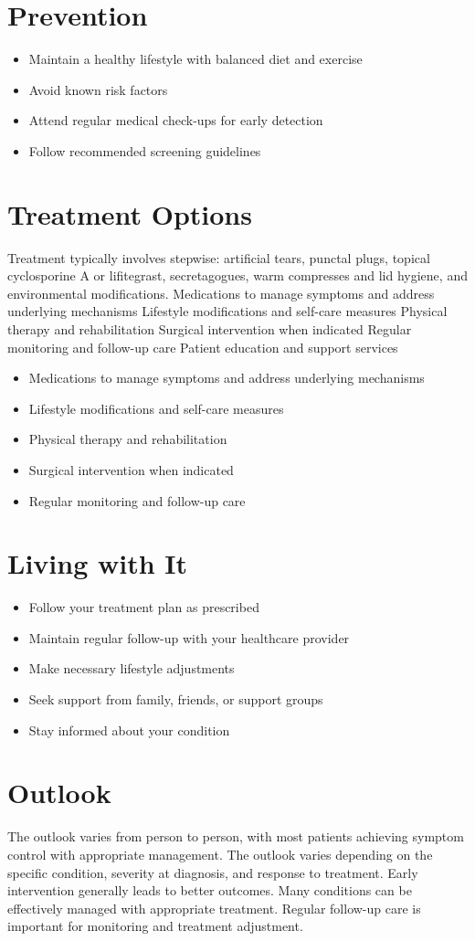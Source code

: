 \section{Prevention}
\begin{itemize}[noitemsep]
  \item Maintain a healthy lifestyle with balanced diet and exercise
  \item Avoid known risk factors
  \item Attend regular medical check-ups for early detection
  \item Follow recommended screening guidelines
\end{itemize}
\section{Treatment Options}
Treatment typically involves stepwise: artificial tears, punctal plugs, topical cyclosporine A or lifitegrast, secretagogues, warm compresses and lid hygiene, and environmental modifications. Medications to manage symptoms and address underlying mechanisms Lifestyle modifications and self-care measures Physical therapy and rehabilitation Surgical intervention when indicated Regular monitoring and follow-up care Patient education and support services

\begin{itemize}[noitemsep]
  \item Medications to manage symptoms and address underlying mechanisms
  \item Lifestyle modifications and self-care measures
  \item Physical therapy and rehabilitation
  \item Surgical intervention when indicated
  \item Regular monitoring and follow-up care
\end{itemize}
\section{Living with It}
\begin{itemize}[noitemsep]
  \item Follow your treatment plan as prescribed
  \item Maintain regular follow-up with your healthcare provider
  \item Make necessary lifestyle adjustments
  \item Seek support from family, friends, or support groups
  \item Stay informed about your condition
\end{itemize}
\section{Outlook}
The outlook varies from person to person, with most patients achieving symptom control with appropriate management. The outlook varies depending on the specific condition, severity at diagnosis, and response to treatment. Early intervention generally leads to better outcomes. Many conditions can be effectively managed with appropriate treatment. Regular follow-up care is important for monitoring and treatment adjustment.
